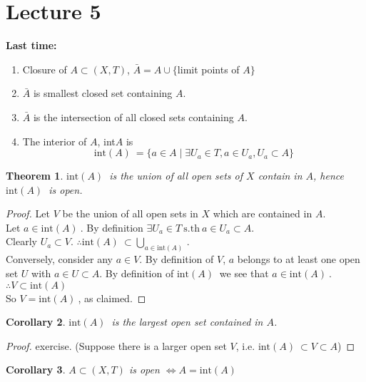 \documentclass{article}
\newcommand{\sth}{\mathrm{s.th}\ }
\newcommand{\Int}[1]{\mathrm{int}(#1)\ }
\newtheorem{stheorem}{Theorem}[theorem]
\newtheorem{scorollary}[stheorem]{Corollary}
\theoremstyle{remark}
\theoremstyle{example}
\theoremstyle{examples}
\begin{document}
	\section*{Lecture 5}
	\textbf{Last time:}
	\begin{enumerate}
		\item Closure of $A \subset (X,T)$, $\bar{A}=A \cup \{$limit points of $A\}$
		\item $\bar{A}$ is smallest closed set containing $A$.
		\item $\bar{A}$ is the intersection of all closed sets containing $A$.
		\item The interior of $A$, int$A$ is \[\Int{A}=\{a \in A \mid \exists U_a \in T, a \in U_a, U_a \subset A\}\]
	\end{enumerate}

	\begin{stheorem}
		$\Int{A}$ is the union of all open sets of $X$ contain in $A$, hence $\Int{A}$ is open.
	\end{stheorem}
	\begin{proof}
		Let $V$ be the union of all open sets in $X$ which are contained in $A$.\\
		Let $a \in \Int{A}$. By definition $\exists U_a \in T\ \sth a \in U_a \subset A$.\\
		Clearly $U_a \subset V$. $\therefore \Int{A} \subset \bigcup_{a \in \Int{A}}$.\\
		Conversely, consider any $a \in V$. By definition of $V$, $a$ belongs to at least one open set $U$ with $a \in U \subset A$. By definition of $\Int{A}$ we see that $a \in \Int{A}$.\\
		$\therefore V \subset\Int{A}$\\
		So $V = \Int{A}$, as claimed.
	\end{proof}
	\begin{scorollary}
		$\Int{A}$ is the largest open set contained in $A$.
	\end{scorollary}
	\begin{proof}
		exercise. (Suppose there is a larger open set $V$, i.e. $\Int{A}\subset V \subset A$)
	\end{proof}

	\begin{scorollary}
		$A \subset(X,T)$ is open $\iff A = \Int{A}$
	\end{scorollary}
\end{document}
